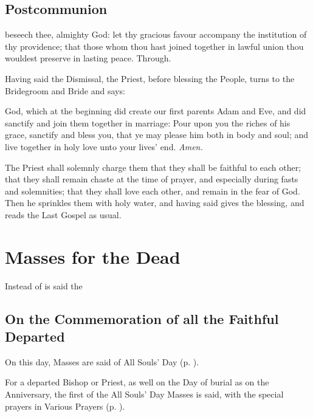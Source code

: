 \subsection{Postcommunion}
 beseech thee, almighty God: let thy gracious favour accompany the institution of thy providence; that those whom thou hast joined together in lawful union thou wouldest preserve in lasting peace. Through.

\clearpage
\begin{rubric}
    Having said the Dismissal, the Priest, before blessing the People, turns to the Bridegroom and Bride and says:
\end{rubric}
 God, which at the beginning did create our first parents Adam and Eve, and did sanctify and join them together in marriage: Pour upon you the riches of his grace, sanctify and {} bless you, that ye may please him both in body and soul; and live together in holy love unto your lives' end. \textit{Amen.}
\begin{rubric}
    The Priest shall solemnly charge them that they shall be faithful to each other; that they shall remain chaste at the time of prayer, and especially during fasts and solemnities; that they shall love each other, and remain in the fear of God. Then he sprinkles them with holy water, and having said  gives the blessing, and reads the Last Gospel as usual.
\end{rubric}

\clearpage
\section{Masses for the Dead}\label{RequiemMasses}
\fancyhead[RE,LO]{}
\begin{secrubric}
    Instead of  is said the 
\end{secrubric}
\vspace{-2ex}
\subsection{On the Commemoration of all the Faithful Departed}
\begin{rubric}
    On this day, Masses are said of All Souls' Day (p. \pageref{AllSouls}).
\end{rubric}
\begin{rubric}
    For a departed Bishop or Priest, as well on the Day of burial as on the Anniversary, the first of the All Souls' Day Masses is said, with the special prayers in Various Prayers (p. \pageref{RequiemPrayers}).
\end{rubric}
